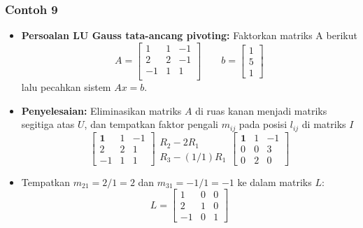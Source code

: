 \documentclass[pdflatex,compress,mathserif]{beamer}
\begin{document}
\begin{frame}
	\frametitle{Contoh 9}
	\begin{itemize}
		\item \textbf{Persoalan LU Gauss tata-ancang pivoting:} Faktorkan matriks A berikut
		\[ A = \begin{bmatrix}
		1 & 1 & -1 \\
		2 & 2 & -1 \\
		-1& 1 & 1 \\
		\end{bmatrix}
		\qquad
		b = \begin{bmatrix}
		1 \\ 5 \\ 1
		\end{bmatrix}
		\]
		lalu pecahkan sistem $ Ax = b $.
	\end{itemize}
\end{frame}

\begin{frame}
	\begin{itemize}
		\item \textbf{Penyelesaian:} Eliminasikan matriks $ A $ di ruas kanan menjadi matriks segitiga atas $ U $, dan tempatkan faktor pengali $ m_{ij} $ pada posisi $ l_{ij} $ di matriks $ I $
		\[ \begin{bmatrix}
			\textbf{1} & 1 & -1 \\
			2 & 2 & 1 \\
			-1 & 1 & 1
		\end{bmatrix}
		\begin{matrix}
		\\ R_2 - 2R_1 \\
		R_3 - (1/1)R_1
		\end{matrix}
		\begin{bmatrix}
		\textbf{1} & 1 & -1 \\
		0 & 0 & 3 \\
		0 & 2 & 0
		\end{bmatrix} \]
		\item Tempatkan $ m_{21} = 2/1 = 2 $ dan $ m_{31} = -1/1 = -1 $ ke dalam matriks $ L $:
		\[ L = \begin{bmatrix}
			1 & 0 & 0 \\
			2 & 1 & 0 \\
			-1 & 0 & 1
		\end{bmatrix} \]
	\end{itemize}
\end{frame}
\end{document}
